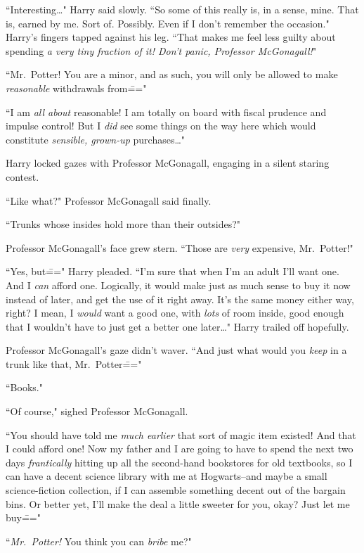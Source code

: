 ``Interesting{\ldots}" Harry said slowly. ``So some of this really is, in a sense, mine. That is, earned by me. Sort of. Possibly. Even if I don't remember the occasion." Harry's fingers tapped against his leg. ``That makes me feel less guilty about spending \emph{a very tiny fraction of it! Don't panic, Professor McGonagall!}"

``Mr.~Potter! You are a minor, and as such, you will only be allowed to make \emph{reasonable} withdrawals from\==="

``I am \emph{all about} reasonable! I am totally on board with fiscal prudence and impulse control! But I \emph{did} see some things on the way here which would constitute \emph{sensible, grown-up} purchases{\ldots}"

Harry locked gazes with Professor McGonagall, engaging in a silent staring contest.

``Like what?" Professor McGonagall said finally.

``Trunks whose insides hold more than their outsides?"

Professor McGonagall's face grew stern. ``Those are \emph{very} expensive, Mr.~Potter!"

``Yes, but\===" Harry pleaded. ``I'm sure that when I'm an adult I'll want one. And I \emph{can} afford one. Logically, it would make just as much sense to buy it now instead of later, and get the use of it right away. It's the same money either way, right? I mean, I \emph{would} want a good one, with \emph{lots} of room inside, good enough that I wouldn't have to just get a better one later{\ldots}" Harry trailed off hopefully.

Professor McGonagall's gaze didn't waver. ``And just what would you \emph{keep} in a trunk like that, Mr.~Potter\==="

``Books."

``Of course," sighed Professor McGonagall.

``You should have told me \emph{much earlier} that sort of magic item existed! And that I could afford one! Now my father and I are going to have to spend the next two days \emph{frantically} hitting up all the second-hand bookstores for old textbooks, so I can have a decent science library with me at Hogwarts\---and maybe a small science-fiction collection, if I can assemble something decent out of the bargain bins. Or better yet, I'll make the deal a little sweeter for you, okay? Just let me buy\==="

``\emph{Mr.~Potter!} You think you can \emph{bribe} me?"

